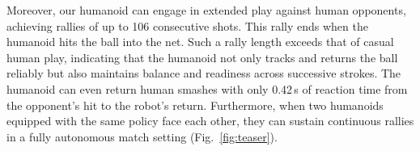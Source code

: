 Moreover, our humanoid can engage in extended play against human opponents, achieving rallies of up to 106 consecutive shots. This rally ends when the humanoid hits the ball into the net. Such a rally length exceeds that of casual human play, indicating that the humanoid not only tracks and returns the ball reliably but also maintains balance and readiness across successive strokes. The humanoid can even return human smashes with only 0.42\,s of reaction time from the opponent’s hit to the robot’s return. Furthermore, when two humanoids equipped with the same policy face each other, they can sustain continuous rallies in a fully autonomous match setting (Fig.~\ref{fig:teaser}).
